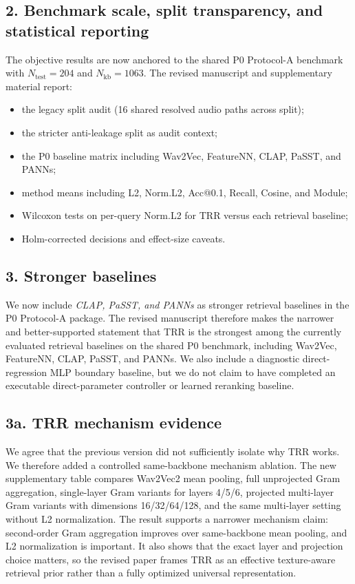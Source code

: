 \documentclass[11pt,a4paper]{article}
\begin{document}
\subsection*{2. Benchmark scale, split transparency, and statistical reporting}

The objective results are now anchored to the shared P0 Protocol-A benchmark with $N_{\mathrm{test}}=204$ and $N_{\mathrm{kb}}=1063$. The revised manuscript and supplementary material report:

\begin{itemize}[leftmargin=2em]
    \item the legacy split audit (16 shared resolved audio paths across split);
    \item the stricter anti-leakage split as audit context;
    \item the P0 baseline matrix including Wav2Vec, FeatureNN, CLAP, PaSST, and PANNs;
    \item method means including L2, Norm.L2, Acc@0.1, Recall, Cosine, and Module;
    \item Wilcoxon tests on per-query Norm.L2 for TRR versus each retrieval baseline;
    \item Holm-corrected decisions and effect-size caveats.
\end{itemize}

\subsection*{3. Stronger baselines}

We now include \emph{CLAP, PaSST, and PANNs} as stronger retrieval baselines in the P0 Protocol-A package. The revised manuscript therefore makes the narrower and better-supported statement that TRR is the strongest among the currently evaluated retrieval baselines on the shared P0 benchmark, including Wav2Vec, FeatureNN, CLAP, PaSST, and PANNs. We also include a diagnostic direct-regression MLP boundary baseline, but we do not claim to have completed an executable direct-parameter controller or learned reranking baseline.

\subsection*{3a. TRR mechanism evidence}

We agree that the previous version did not sufficiently isolate why TRR works. We therefore added a controlled same-backbone mechanism ablation. The new supplementary table compares Wav2Vec2 mean pooling, full unprojected Gram aggregation, single-layer Gram variants for layers 4/5/6, projected multi-layer Gram variants with dimensions 16/32/64/128, and the same multi-layer setting without L2 normalization. The result supports a narrower mechanism claim: second-order Gram aggregation improves over same-backbone mean pooling, and L2 normalization is important. It also shows that the exact layer and projection choice matters, so the revised paper frames TRR as an effective texture-aware retrieval prior rather than a fully optimized universal representation.
\end{document}
